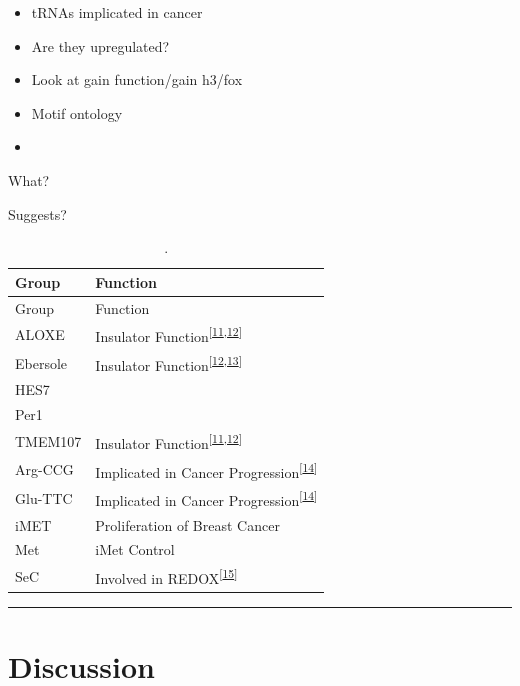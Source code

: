 \documentclass[
  12pt,
]{article}
\begin{document}
\begin{itemize}
\item
  tRNAs implicated in cancer
\item
  Are they upregulated?
\item
  Look at gain function/gain h3/fox
\item
  Motif ontology
\item
\end{itemize}

What?

Suggests?

\begin{longtable}[]{@{}ll@{}}
\caption{\label{tab:clusters}.}\tabularnewline
\toprule()
Group & Function \\
\midrule()
\endfirsthead
\toprule()
Group & Function \\
\midrule()
\endhead
ALOXE & Insulator Function\textsuperscript{{[}\protect\hyperlink{ref-raab2011}{11},\protect\hyperlink{ref-sizer2022}{12}{]}} \\
Ebersole & Insulator Function\textsuperscript{{[}\protect\hyperlink{ref-sizer2022}{12},\protect\hyperlink{ref-Ebersole2011}{13}{]}} \\
HES7 & \\
Per1 & \\
TMEM107 & Insulator Function\textsuperscript{{[}\protect\hyperlink{ref-raab2011}{11},\protect\hyperlink{ref-sizer2022}{12}{]}} \\
Arg-CCG & Implicated in Cancer Progression\textsuperscript{{[}\protect\hyperlink{ref-Goodarzi2016}{14}{]}} \\
Glu-TTC & Implicated in Cancer Progression\textsuperscript{{[}\protect\hyperlink{ref-Goodarzi2016}{14}{]}} \\
iMET & Proliferation of Breast Cancer \\
Met & iMet Control \\
SeC & Involved in REDOX\textsuperscript{{[}\protect\hyperlink{ref-Sangha2022}{15}{]}} \\
\bottomrule()
\end{longtable}

\begin{center}\rule{0.5\linewidth}{0.5pt}\end{center}

\hypertarget{discussion}{%
\section{Discussion}\label{discussion}}
\end{document}
